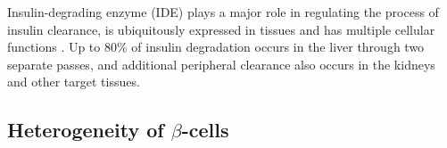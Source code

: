



Insulin-degrading enzyme (IDE) plays a major role in regulating the process of insulin clearance, is ubiquitously expressed in tissues and has multiple cellular functions \textbf{\cite{duckworth_insulin_1998}}. Up to 80\% of insulin degradation occurs in the liver through two separate passes, and additional peripheral clearance also occurs in the kidneys and other target tissues.




\subsection[Heterogeneity of $\beta$-cells]{Heterogeneity of $\beta$-cells} %
\label{sec:beta_het}


